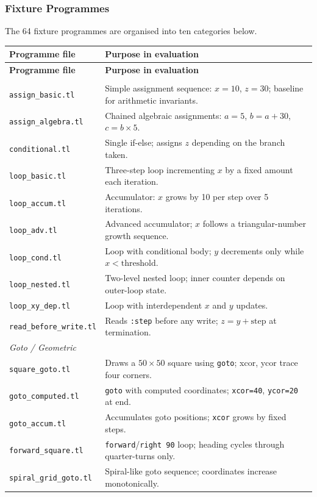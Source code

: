 \subsubsection*{Fixture Programmes}

The 64 fixture programmes are organised into ten categories below.  

{\small
\begin{longtable}{p{} p{}}
\toprule
\textbf{Programme file} & \textbf{Purpose in evaluation} \\
\midrule
\endfirsthead
\toprule
\textbf{Programme file} & \textbf{Purpose in evaluation} \\
\midrule
\endhead
\midrule
\endfoot
\bottomrule
\endlastfoot

\multicolumn{2}{l}{\textit{Linear Arithmetic (Assignment / Loop / Conditional)}} \\
\midrule
\texttt{assign\_basic.tl}       & Simple assignment sequence: $x{=}10$, $z{=}30$; baseline for arithmetic invariants. \\
\texttt{assign\_algebra.tl}     & Chained algebraic assignments: $a{=}5$, $b{=}a{+}30$, $c{=}b{\times}5$. \\
\texttt{conditional.tl}         & Single if-else; assigns $z$ depending on the branch taken. \\
\texttt{loop\_basic.tl}         & Three-step loop incrementing $x$ by a fixed amount each iteration. \\
\texttt{loop\_accum.tl}         & Accumulator: $x$ grows by 10 per step over 5 iterations. \\
\texttt{loop\_adv.tl}           & Advanced accumulator; $x$ follows a triangular-number growth sequence. \\
\texttt{loop\_cond.tl}          & Loop with conditional body; $y$ decrements only while $x < \text{threshold}$. \\
\texttt{loop\_nested.tl}        & Two-level nested loop; inner counter depends on outer-loop state. \\
\texttt{loop\_xy\_dep.tl}       & Loop with interdependent $x$ and $y$ updates. \\
\texttt{read\_before\_write.tl} & Reads \texttt{:step} before any write; $z = y + \text{step}$ at termination. \\

\midrule
\multicolumn{2}{l}{\textit{Goto / Geometric}} \\
\midrule
\texttt{square\_goto.tl}        & Draws a $50{\times}50$ square using \texttt{goto}; xcor, ycor trace four corners. \\
\texttt{goto\_computed.tl}      & \texttt{goto} with computed coordinates; \texttt{xcor=40}, \texttt{ycor=20} at end. \\
\texttt{goto\_accum.tl}         & Accumulates goto positions; \texttt{xcor} grows by fixed steps. \\
\texttt{forward\_square.tl}     & \texttt{forward}/\texttt{right 90} loop; heading cycles through quarter-turns only. \\
\texttt{spiral\_grid\_goto.tl}  & Spiral-like goto sequence; coordinates increase monotonically. \\


\end{longtable}}

